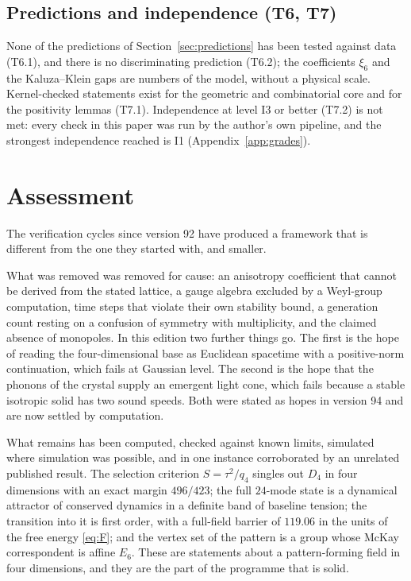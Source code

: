 \documentclass[a4paper,11pt]{article}
\numberwithin{equation}{section}
\theoremstyle{jsplain}
\theoremstyle{jsrem}
\begin{document}
\subsection{Predictions and independence (T6, T7)}

None of the predictions of Section~\ref{sec:predictions} has been tested against data (T6.1), and there is no discriminating prediction (T6.2); the coefficients $\xi_6$ and the Kaluza--Klein gaps are numbers of the model, without a physical scale. Kernel-checked statements exist for the geometric and combinatorial core and for the positivity lemmas (T7.1). Independence at level I3 or better (T7.2) is not met: every check in this paper was run by the author's own pipeline, and the strongest independence reached is I1 (Appendix~\ref{app:grades}).

\section{Assessment}\label{sec:assessment}

The verification cycles since version 92 have produced a framework that is different from the one they started with, and smaller.

What was removed was removed for cause: an anisotropy coefficient that cannot be derived from the stated lattice, a gauge algebra excluded by a Weyl-group computation, time steps that violate their own stability bound, a generation count resting on a confusion of symmetry with multiplicity, and the claimed absence of monopoles. In this edition two further things go. The first is the hope of reading the four-dimensional base as Euclidean spacetime with a positive-norm continuation, which fails at Gaussian level. The second is the hope that the phonons of the crystal supply an emergent light cone, which fails because a stable isotropic solid has two sound speeds. Both were stated as hopes in version 94 and are now settled by computation.

What remains has been computed, checked against known limits, simulated where simulation was possible, and in one instance corroborated by an unrelated published result. The selection criterion $S=\tau^2/q_4$ singles out $D_4$ in four dimensions with an exact margin $496/423$; the full $24$-mode state is a dynamical attractor of conserved dynamics in a definite band of baseline tension; the transition into it is first order, with a full-field barrier of $119.06$ in the units of the free energy \eqref{eq:F}; and the vertex set of the pattern is a group whose McKay correspondent is affine $E_6$. These are statements about a pattern-forming field in four dimensions, and they are the part of the programme that is solid.
\end{document}
